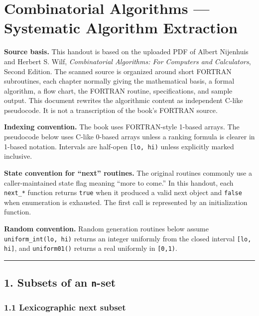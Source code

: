 \documentclass[11pt]{article}
\begin{document}
\section{Combinatorial Algorithms --- Systematic Algorithm Extraction}\label{combinatorial-algorithms-systematic-algorithm-extraction}

\textbf{Source basis.} This handout is based on the uploaded PDF of Albert Nijenhuis and Herbert S. Wilf, \emph{Combinatorial Algorithms: For Computers and Calculators}, Second Edition. The scanned source is organized around short FORTRAN subroutines, each chapter normally giving the mathematical basis, a formal algorithm, a flow chart, the FORTRAN routine, specifications, and sample output. This document rewrites the algorithmic content as independent C-like pseudocode. It is not a transcription of the book's FORTRAN source.

\textbf{Indexing convention.} The book uses FORTRAN-style 1-based arrays. The pseudocode below uses C-like 0-based arrays unless a ranking formula is clearer in 1-based notation. Intervals are half-open \texttt{[lo, hi)} unless explicitly marked inclusive.

\textbf{State convention for ``next'' routines.} The original routines commonly use a caller-maintained state flag meaning ``more to come.'' In this handout, each \texttt{next\_*} function returns \texttt{true} when it produced a valid next object and \texttt{false} when enumeration is exhausted. The first call is represented by an initialization function.

\textbf{Random convention.} Random generation routines below assume \texttt{uniform\_int(lo, hi)} returns an integer uniformly from the closed interval \texttt{[lo, hi]}, and \texttt{uniform01()} returns a real uniformly in \texttt{[0,1)}.

\begin{center}\rule{0.5\linewidth}{0.5pt}\end{center}

\subsection{\texorpdfstring{1. Subsets of an \texttt{n}-set}{1. Subsets of an n-set}}\label{subsets-of-an-n-set}

\subsubsection{1.1 Lexicographic next subset}\label{lexicographic-next-subset}
\end{document}
